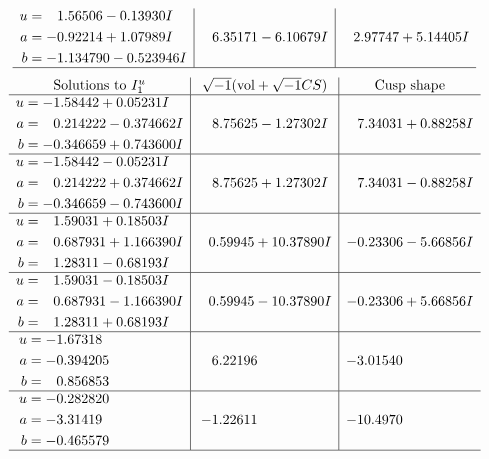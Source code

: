 \documentclass[1p]{elsarticle_modified}
\theoremstyle{definition}
\newcommand{\I}{\sqrt{-1}}
\begin{document}
$$\begin{array}{c|c|c}
\begin{aligned}
u &= \phantom{-}1.56506 - 0.13930 I \\
a &= -0.92214 + 1.07989 I \\
b &= -1.134790 - 0.523946 I\end{aligned}
 & \phantom{-}6.35171 - 6.10679 I & \phantom{-}2.97747 + 5.14405 I\\
 \hline 
 \end{array}$$\newpage$$\begin{array}{c|c|c}  
\text{Solutions to }I^u_{1}& \I (\text{vol} + \sqrt{-1}CS) & \text{Cusp shape}\\
 \hline 
\begin{aligned}
u &= -1.58442 + 0.05231 I \\
a &= \phantom{-}0.214222 - 0.374662 I \\
b &= -0.346659 + 0.743600 I\end{aligned}
 & \phantom{-}8.75625 - 1.27302 I & \phantom{-}7.34031 + 0.88258 I \\ \hline\begin{aligned}
u &= -1.58442 - 0.05231 I \\
a &= \phantom{-}0.214222 + 0.374662 I \\
b &= -0.346659 - 0.743600 I\end{aligned}
 & \phantom{-}8.75625 + 1.27302 I & \phantom{-}7.34031 - 0.88258 I \\ \hline\begin{aligned}
u &= \phantom{-}1.59031 + 0.18503 I \\
a &= \phantom{-}0.687931 + 1.166390 I \\
b &= \phantom{-}1.28311 - 0.68193 I\end{aligned}
 & \phantom{-}0.59945 + 10.37890 I & -0.23306 - 5.66856 I \\ \hline\begin{aligned}
u &= \phantom{-}1.59031 - 0.18503 I \\
a &= \phantom{-}0.687931 - 1.166390 I \\
b &= \phantom{-}1.28311 + 0.68193 I\end{aligned}
 & \phantom{-}0.59945 - 10.37890 I & -0.23306 + 5.66856 I \\ \hline\begin{aligned}
u &= -1.67318\phantom{ +0.000000I} \\
a &= -0.394205\phantom{ +0.000000I} \\
b &= \phantom{-}0.856853\phantom{ +0.000000I}\end{aligned}
 & \phantom{-}6.22196\phantom{ +0.000000I} & -3.01540\phantom{ +0.000000I} \\ \hline\begin{aligned}
u &= -0.282820\phantom{ +0.000000I} \\
a &= -3.31419\phantom{ +0.000000I} \\
b &= -0.465579\phantom{ +0.000000I}\end{aligned}
 & -1.22611\phantom{ +0.000000I} & -10.4970\phantom{ +0.000000I}\\
 \hline 
 \end{array}$$\newpage\newpage\renewcommand{\arraystretch}{1}
\end{document}

